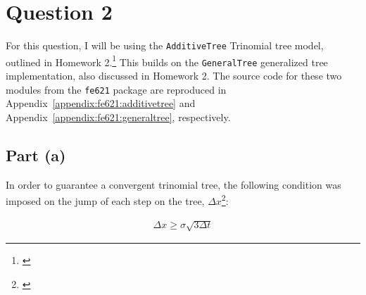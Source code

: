 \documentclass[10pt]{article}
\begin{document}
\newpage
\section{Question 2}


\vspace{2em}

For this question, I will be using the \texttt{AdditiveTree} Trinomial tree model, outlined in Homework 2.\footnote{\cite{Weerawarana2019}} This builds on the \texttt{GeneralTree} generalized tree implementation, also discussed in Homework 2. The source code for these two modules from the \texttt{fe621} package are reproduced in Appendix~\ref{appendix:fe621:additivetree} and Appendix~\ref{appendix:fe621:generaltree}, respectively.


\subsection{Part (a)}

In order to guarantee a convergent trinomial tree, the following condition was imposed on the jump of each step on the tree, $\Delta x$\footnote{\cite{Florescu2019a}}:

\begin{gather*}
    \Delta x \geq \sigma \sqrt{3 \Delta t}
\end{gather*}
\end{document}
